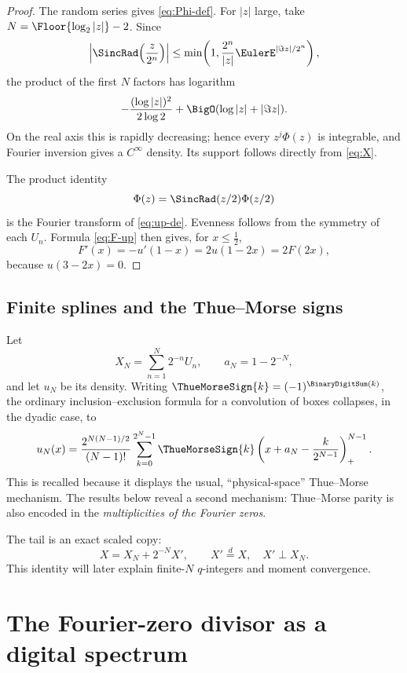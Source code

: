 \documentclass[11pt,oneside]{article}
\theoremstyle{definition}
\theoremstyle{remark}
\begin{document}
\begin{proof}
The random series gives \eqref{eq:Phi-def}.  For \(|z|\) large, take
\(N=\Floor{\log_2|z|}-2\).  Since
\[
 \left|\SincRad\!\left(\frac z{2^n}\right)\right|
 \leq \min\!\left(1,\frac{2^n}{|z|}\EulerE^{|\Im z|/2^n}\right),
\]
the product of the first \(N\) factors has logarithm
\[
 -\frac{(\log|z|)^2}{2\log2}+\BigO(\log|z|+|\Im z|).
\]
On the real axis this is rapidly decreasing; hence every
\(z^j\Phi(z)\) is integrable, and Fourier inversion gives a \(C^\infty\)
density.  Its support follows directly from \eqref{eq:X}.

The product identity
\[
 \Phi(z)=\SincRad(z/2)\Phi(z/2)
\]
is the Fourier transform of \eqref{eq:up-de}.  Evenness follows from the
symmetry of each \(U_n\).  Formula \eqref{eq:F-up} then gives, for
\(x\leq\frac12\),
\[
 F'(x)=-u'(1-x)
      =2u(1-2x)=2F(2x),
\]
because \(u(3-2x)=0\).
\end{proof}

\subsection{Finite splines and the Thue--Morse signs}

Let
\[
 X_N=\sum_{n=1}^{N}2^{-n}U_n,
 \qquad
 a_N=1-2^{-N},
\]
and let \(u_N\) be its density.  Writing
\(\ThueMorseSign{k}=(-1)^{\BinaryDigitSum(k)}\), the ordinary inclusion--exclusion formula for a
convolution of boxes collapses, in the dyadic case, to
\begin{equation}
 u_N(x)=
 \frac{2^{N(N-1)/2}}{(N-1)!}
 \sum_{k=0}^{2^N-1}
 \ThueMorseSign{k}
 \left(
   x+a_N-\frac{k}{2^{N-1}}
 \right)_{+}^{N-1}.
 \label{eq:finite-spline}
\end{equation}
This is recalled because it displays the usual, ``physical-space''
Thue--Morse mechanism.  The results below reveal a second mechanism:
Thue--Morse parity is also encoded in the \emph{multiplicities of the
Fourier zeros}.

The tail is an exact scaled copy:
\begin{equation}
 X=X_N+2^{-N}X',
 \qquad X'\stackrel d=X,\quad X'\perp X_N.
 \label{eq:tail-copy}
\end{equation}
This identity will later explain finite-\(N\) \(q\)-integers and moment
convergence.

\section{The Fourier-zero divisor as a digital spectrum}
\end{document}
